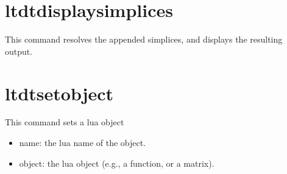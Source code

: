 \section{ltdtdisplaysimplices}
This command resolves the appended simplices, and displays the resulting 
output.

\section{ltdtsetobject}
This command sets a lua object
\begin{itemize}
    \item name: the lua name of the object.
    \item object: the lua object (e.g., a function, or a matrix).
\end{itemize}